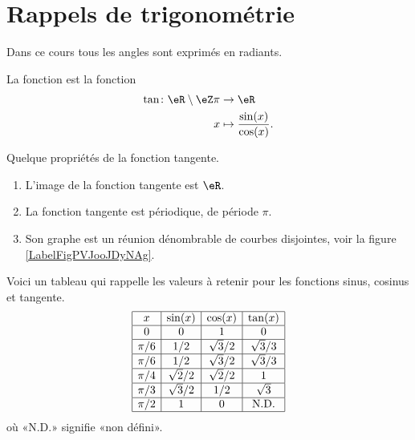 \section{Rappels de trigonométrie}
\label{secHTVooJuBtam}

Dans ce cours tous les angles sont exprimés en radiants. 

\begin{definition}
  La fonction  est la fonction
  \begin{equation}
      \begin{aligned}
          \tan\colon \eR\setminus \eZ\pi&\to \eR \\
          x&\mapsto \frac{ \sin(x) }{ \cos(x) }. 
      \end{aligned}
  \end{equation}
\end{definition} 
  
\begin{proposition}
    Quelque propriétés de la fonction tangente.
    \begin{enumerate}
        \item
            L'image de la fonction tangente est $\eR$. 
        \item
            La fonction tangente est périodique, de période $\pi$.
        \item
            Son graphe est un réunion dénombrable de courbes disjointes, voir la figure \ref{LabelFigPVJooJDyNAg}. 
    \end{enumerate}
\end{proposition}

Voici un tableau qui rappelle les valeurs à retenir pour les fonctions sinus, cosinus et tangente.
\begin{equation*}
    \begin{array}[]{|c|c|c|c|}
      \hline
      x&\sin(x)&\cos(x)&\tan(x)\\
      \hline
      0&0&1&0\\
      \hline
      \pi/6&1/2&\sqrt{3}/2&\sqrt{3}/3\\
      \hline
      \pi/6&1/2&\sqrt{3}/2&\sqrt{3}/3\\
      \hline
      \pi/4&\sqrt{2}/2&\sqrt{2}/2&1\\
      \hline
      \pi/3&\sqrt{3}/2&1/2&\sqrt{3}\\
      \hline
      \pi/2&1&0&\text{N.D.}\\
      \hline
    \end{array}
\end{equation*}
où «N.D.»  signifie «non défini».


